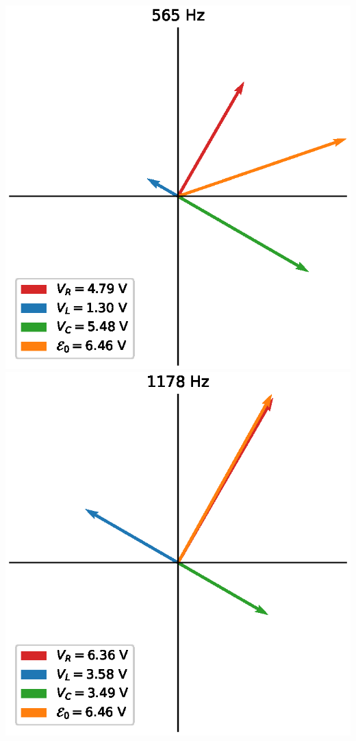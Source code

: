 \documentclass[12pt]{iopart} %
\begin{document}
\includegraphics{media/part_3_565_hz.eps}
\includegraphics{media/part_3_1178_hz.eps}
\end{document}
